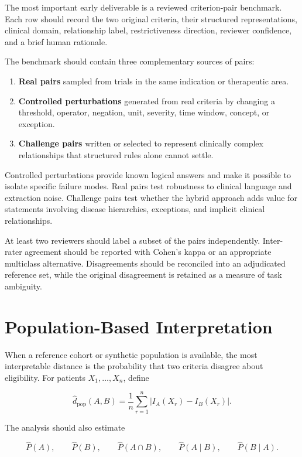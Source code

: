 \documentclass[11pt]{article}
\begin{document}
The most important early deliverable is a reviewed criterion-pair benchmark. Each row should record the two original criteria, their structured representations, clinical domain, relationship label, restrictiveness direction, reviewer confidence, and a brief human rationale.

The benchmark should contain three complementary sources of pairs:

\begin{enumerate}
    \item \textbf{Real pairs} sampled from trials in the same indication or therapeutic area.
    \item \textbf{Controlled perturbations} generated from real criteria by changing a threshold, operator, negation, unit, severity, time window, concept, or exception.
    \item \textbf{Challenge pairs} written or selected to represent clinically complex relationships that structured rules alone cannot settle.
\end{enumerate}

Controlled perturbations provide known logical answers and make it possible to isolate specific failure modes. Real pairs test robustness to clinical language and extraction noise. Challenge pairs test whether the hybrid approach adds value for statements involving disease hierarchies, exceptions, and implicit clinical relationships.

At least two reviewers should label a subset of the pairs independently. Inter-rater agreement should be reported with Cohen's kappa or an appropriate multiclass alternative. Disagreements should be reconciled into an adjudicated reference set, while the original disagreement is retained as a measure of task ambiguity.

\section{Population-Based Interpretation}

When a reference cohort or synthetic population is available, the most interpretable distance is the probability that two criteria disagree about eligibility. For patients $X_1,\ldots,X_n$, define

\[
\widehat d_{\mathrm{pop}}(A,B)
=\frac{1}{n}\sum_{r=1}^{n}
\left|I_A(X_r)-I_B(X_r)\right|.
\]

The analysis should also estimate

\[
\widehat P(A),\qquad
\widehat P(B),\qquad
\widehat P(A\cap B),\qquad
\widehat P(A\mid B),\qquad
\widehat P(B\mid A).
\]
\end{document}
